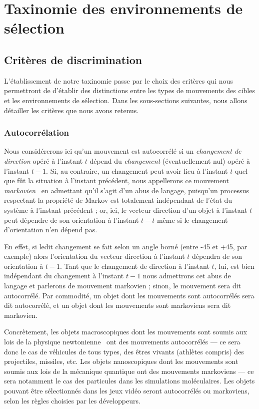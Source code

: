\section{Taxinomie des environnements de sélection}

    \subsection{Critères de discrimination}
    L'établissement de notre taxinomie passe par le choix des critères qui nous permettront de d'établir des distinctions entre les types de mouvements des cibles et les environnements de sélection. Dans les sous-sections suivantes, nous allons détailler les critères que nous avons retenus.

    \subsubsection{Autocorrélation}
    Nous considérerons ici qu'un mouvement est autocorrélé si un \emph{changement de direction} opéré à l'instant $t$ dépend du \emph{changement} (éventuellement nul) opéré à l'instant $t-1$. Si, au contraire, un changement peut avoir lieu à l'instant $t$ quel que fût la situation à l'instant précédent, nous appellerons ce mouvement \emph{markovien}~\cite{markov1960theory} en admettant qu'il s'agit d'un abus de langage, puisqu'un processus respectant la propriété de Markov est totalement indépendant de l'état du système à l'instant précédent ; or, ici, le vecteur direction d'un objet à l'instant $t$ peut dépendre de son orientation à l'instant $t-t$ même si le changement d'orientation n'en dépend pas.
    
    En effet, si ledit changement se fait selon un angle borné (entre -45\textdegree{} et +45\textdegree{}, par exemple) alors l'orientation du vecteur direction à l'instant $t$ dépendra de son orientation à $t-1$. Tant que le changement de direction à l'instant $t$, lui, est bien indépendant du changement à l'instant $t-1$ nous admettrons cet abus de langage et parlerons de mouvement markovien ; sinon, le mouvement sera dit autocorrélé. Par commodité, un objet dont les mouvements sont autocorrélés sera dit autocorrélé, et un objet dont les mouvements sont markoviens sera dit markovien.
    
    Concrètement, les objets macroscopiques dont les mouvements sont soumis aux lois de la physique newtonienne~\cite{newton1833philosophiae} ont des mouvements autocorrélés --- ce sera donc le cas de véhicules de tous types, des êtres vivants (athlètes compris) des projectiles, missiles, etc. Les objets nanoscopiques dont les mouvements sont soumis aux lois de la mécanique quantique ont des mouvements markoviens --- ce sera notamment le cas des particules dans les simulations moléculaires. Les objets pouvant être sélectionnés dans les jeux vidéo seront autocorrélés ou markoviens, selon les règles choisies par les développeurs.


